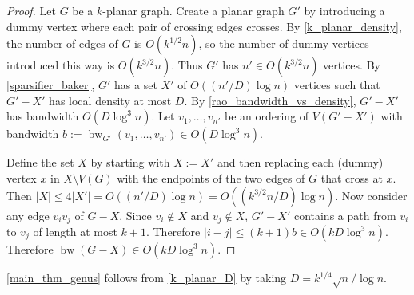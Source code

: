 \documentclass{patmorin}
\renewcommand{\le}{\leqslant}
\DeclareMathOperator{\bw}{bw}
\begin{document}
\begin{proof}
  Let $G$ be a $k$-planar graph.  Create a planar graph $G'$ by introducing a dummy vertex where each pair of crossing edges crosses.  By \cref{k_planar_density}, the number of edges of $G$ is $O(k^{1/2} n)$, so the number of dummy vertices introduced this way is $O(k^{3/2} n)$.  Thus $G'$ has $n'\in O(k^{3/2} n)$ vertices.
  By \cref{sparsifier_baker}, $G'$ has a set $X'$ of $O((n'/D)\log n)$ vertices such that $G'-X'$ has local density at most $D$.  By \cref{rao_bandwidth_vs_density}, $G'-X'$ has bandwidth $O(D\log^3 n)$. Let $v_1,\ldots,v_{n'}$ be an ordering of $V(G'-X')$ with bandwidth $b:=\bw_{G'}(v_1,\ldots,v_{n'})\in O(D\log^3 n)$.

  Define the set $X$ by starting with $X:=X'$ and then replacing each (dummy) vertex $x$ in $X\setminus V(G)$ with the endpoints of the two edges of $G$ that cross at $x$.  Then $|X|\le 4|X'|=O((n'/D)\log n)=O((k^{3/2}n/D)\log n)$. Now consider any edge $v_i v_j$ of $G-X$. Since $v_i\not\in X$ and $v_j\not\in X$, $G'-X'$ contains a path from $v_i$ to $v_j$ of length at most $k+1$.  Therefore $|i-j|\le (k+1)b\in O(kD\log^3 n)$.  Therefore $\bw(G-X)\in O(kD\log^3 n)$.
\end{proof}

\cref{main_thm_genus} follows from \cref{k_planar_D} by taking  $D=k^{1/4}\sqrt{n}/\log n$.



\end{document}
